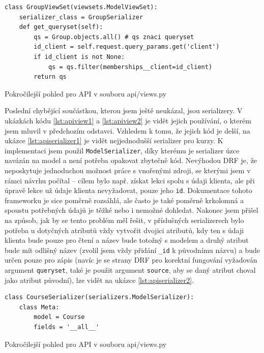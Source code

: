     \begin{listing}[ht]
    	\begin{verbatim}
class GroupViewSet(viewsets.ModelViewSet):
    serializer_class = GroupSerializer
    def get_queryset(self):
        qs = Group.objects.all() # qs znaci queryset
        id_client = self.request.query_params.get('client')
        if id_client is not None:
            qs = qs.filter(memberships__client=id_client)
        return qs
    	\end{verbatim}
    	\caption{Pokročilejší pohled pro API v souboru api/views.py}\label{lst:apiview2}
    \end{listing}
    
    Poslední chybějící součástkou, kterou jsem ještě neukázal, jsou serializery. V ukázkách kódu \ref{lst:apiview1} a \ref{lst:apiview2} je vidět jejich používání, o kterém jsem mluvil v předchozím odstavci. Vzhledem k tomu, že jejich kód je delší, na ukázce \ref{lst:apiserializer1} je vidět nejjednodušší serializer pro kurzy. K implementaci jsem použil \verb|ModelSerializer|, díky kterému je serializer úzce navázán na model a není potřeba opakovat zbytečně kód. Nevýhodou DRF je, že neposkytuje jednoduchou možnost práce s vnořenými zdroji, se kterými jsem v rámci návrhu počítal -- cílem bylo např. získat lekci spolu s údaji klienta, ale při úpravě lekce už údaje klienta nevyžadovat, pouze jeho \verb|id|. Dokumentace tohoto frameworku je sice poměrně rozsáhlá, ale často je také poměrně krkolomná a spoustu potřebných údajů je těžké nebo i nemožné dohledat. Nakonec jsem přišel na způsob, jak by se tento problém měl řešit, v příslušných serializerech bylo potřeba u dotyčných atributů vždy vytvořit dvojici atributů, kdy ten s údaji klienta bude pouze pro čtení a název bude totožný s modelem a druhý atribut bude mít odlišný název (zvolil jsem vždy přidání \verb|_id| k původnímu názvu) a bude určen pouze pro zápis (navíc je se strany DRF pro korektní fungování vyžadován argument \verb|queryset|, také je použit argument \verb|source|, aby se daný atribut choval jako atribut původní), lze vidět na ukázce \ref{lst:apiserializer2}. 
    
    \begin{listing}[ht]
    	\begin{verbatim}
class CourseSerializer(serializers.ModelSerializer):
    class Meta:
        model = Course
        fields = '__all__'
    	\end{verbatim}
    	\caption{Pokročilejší pohled pro API v souboru api/views.py}\label{lst:apiserializer1}
    \end{listing}
    
